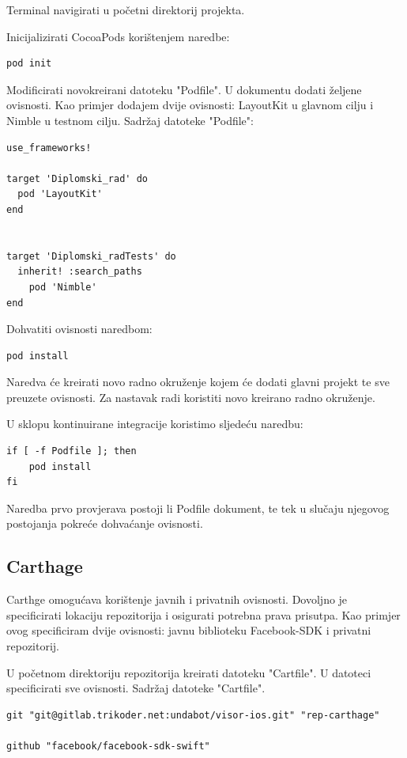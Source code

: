 \documentclass[times, utf8, diplomski, numeric]{fer}
\begin{document}
\begin{appendices}
Terminal navigirati u početni direktorij projekta.

Inicijalizirati CocoaPods korištenjem naredbe:
\begin{verbatim}
pod init
\end{verbatim}

Modificirati novokreirani datoteku "Podfile". U dokumentu dodati željene ovisnosti. Kao primjer dodajem dvije ovisnosti: LayoutKit u glavnom cilju i Nimble u testnom cilju. Sadržaj datoteke "Podfile":
\begin{verbatim}
use_frameworks!

target 'Diplomski_rad' do
  pod 'LayoutKit'
end


target 'Diplomski_radTests' do
  inherit! :search_paths
    pod 'Nimble'
end
\end{verbatim}

Dohvatiti ovisnosti naredbom:
\begin{verbatim}
pod install
\end{verbatim}

Naredva će kreirati novo radno okruženje kojem će dodati glavni projekt te sve preuzete ovisnosti. Za nastavak radi koristiti novo kreirano radno okruženje.

U sklopu kontinuirane integracije koristimo sljedeću naredbu:
\begin{verbatim}
if [ -f Podfile ]; then
    pod install
fi
\end{verbatim}

Naredba prvo provjerava postoji li Podfile dokument, te tek u slučaju njegovog postojanja pokreće dohvaćanje ovisnosti.

\subsection{Carthage}

Carthge omogućava korištenje javnih i privatnih ovisnosti. Dovoljno je specificirati lokaciju repozitorija i osigurati potrebna prava prisutpa. Kao primjer ovog specificiram dvije ovisnosti: javnu biblioteku Facebook-SDK i privatni repozitorij.

U početnom direktoriju repozitorija kreirati datoteku "Cartfile". U datoteci specificirati sve ovisnosti. Sadržaj datoteke "Cartfile".
\begin{verbatim}
git "git@gitlab.trikoder.net:undabot/visor-ios.git" "rep-carthage"

github "facebook/facebook-sdk-swift"
\end{verbatim}


\end{appendices}
\end{document}
